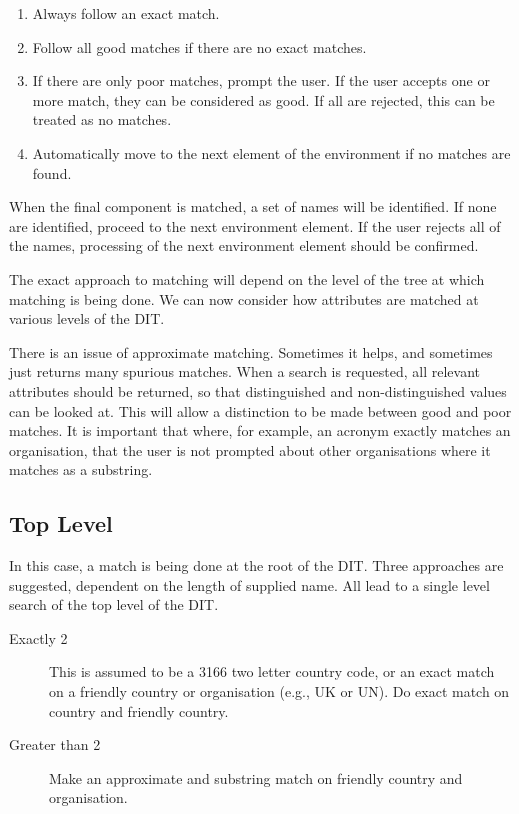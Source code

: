 \begin{enumerate}
\item Always follow an exact match. 
\item Follow all good matches if there are no exact matches.
\item If there are only poor matches, prompt the user.  If the user accepts
one or more match, they can be considered as good.  If all are rejected,
this can be treated as no matches.
\item Automatically move to the next element of the environment if no
matches are found.   
\end{enumerate}

When the final component is matched, a set of names will be identified.
If none are identified, proceed to the next environment element.
If the user rejects all of the names, processing of the next environment
element should be confirmed.

The exact approach to matching will depend on the level of the tree at which
matching is being done.  
We can now consider how attributes are matched at various levels of the DIT.


There is an issue of approximate matching.  Sometimes it helps, and
sometimes just returns many spurious matches.  When a search is requested,
all relevant attributes should be returned, so that distinguished and
non-distinguished values can be looked at.  This will allow a distinction to
be made between good and poor matches.  It is important that where, for
example, an acronym exactly matches an organisation, that the user is not
prompted about other organisations where it matches as a substring.

\subsection {Top Level}

In this case, a match is being done at the root of the DIT.   
Three approaches are suggested, dependent on the length of supplied name.
All lead to a single level search of the top level of the DIT. 

\begin{description}
\item[Exactly 2] This is assumed to be a 3166 two letter country code, or an exact
match on a friendly country or organisation (e.g., UK or UN).  
Do exact match on country and friendly country.
\item[Greater than 2] Make 
an approximate and substring match on friendly country and organisation.

\end{description}






